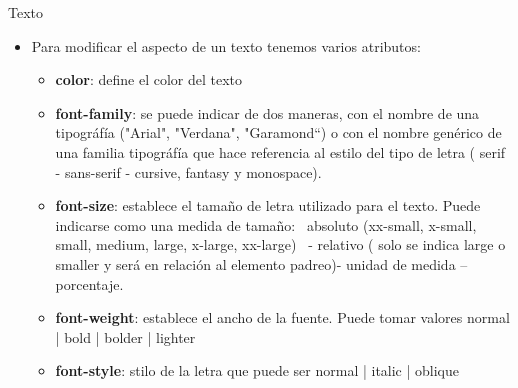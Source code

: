 \documentclass[aspectratio=43,10pt,t]{beamer}
\begin{document}
\begin{frame}{Texto}\relax
\begingroup
{}
\begin{itemize}
  \item\relax Para modificar el aspecto de un texto tenemos varios atributos:
  \begin{itemize}
    \item\relax \textbf{color}: define el color del texto
    \item\relax \textbf{font-family}: se puede indicar de dos maneras, con el nombre de una tipográfía ("Arial", "Verdana", "Garamond“) o con el nombre genérico de una familia tipográfía que hace referencia al estilo del tipo de letra ( serif - sans-serif - cursive, fantasy y monospace).
    \item\relax \textbf{font-size}: establece el tamaño de letra utilizado para el texto. Puede indicarse como una medida de tamaño: ~absoluto (xx-small, x-small, small, medium, large, x-large, xx-large) ~- relativo ( solo se indica large o smaller y será en relación al elemento padreo)- unidad de medida – porcentaje.
    \item\relax \textbf{font-weight}: establece el ancho de la fuente. Puede tomar valores normal | bold | bolder | lighter
    \item\relax \textbf{font-style}: stilo de la letra que puede ser normal | italic | oblique
  \end{itemize}
\end{itemize}
\endgroup
\end{frame}
\end{document}

